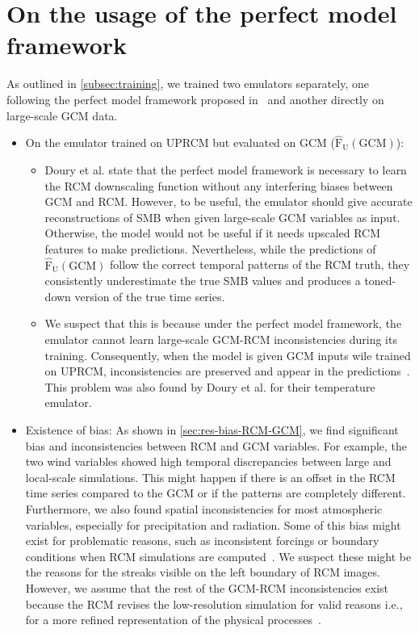\documentclass[a4paper,11pt,oneside]{report}
\begin{document}
\section{On the usage of the perfect model framework}\label{sec:disc-perfect-model}
As outlined in \autoref{subsec:training}, we trained two emulators separately, one following the perfect model framework proposed in~\cite{Doury} and another directly on large-scale GCM data. 
\begin{itemize}
    \item On the emulator trained on UPRCM but evaluated on GCM ($\mathrm{\hat{F}_{U}(GCM)}$): 
    \begin{itemize}
        \item Doury et al. state that the perfect model framework is necessary to learn the RCM downscaling function without any interfering biases between GCM and RCM. However, to be useful, the emulator should give accurate reconstructions of SMB when given large-scale GCM variables as input. Otherwise, the model would not be useful if it needs upscaled RCM features to make predictions. Nevertheless, while the predictions of $\mathrm{\hat{F}_{U}(GCM)}$ follow the correct temporal patterns of the RCM truth, they consistently underestimate the true SMB values and produces a toned-down version of the true time series.
        \item We suspect that this is because under the perfect model framework, the emulator cannot learn large-scale GCM-RCM inconsistencies during its training. Consequently, when the model is given GCM inputs wile trained on UPRCM, inconsistencies are preserved and appear in the predictions~\cite{Doury}. This problem was also found by Doury et al. for their temperature emulator. 
    \end{itemize}
    \item Existence of bias: As shown in \autoref{sec:res-bias-RCM-GCM}, we find significant bias and inconsistencies between RCM and GCM variables. For example, the two wind variables showed high temporal discrepancies between large and local-scale simulations. This might happen if there is an offset in the RCM time series compared to the GCM or if the patterns are completely different. Furthermore, we also found spatial inconsistencies for most atmospheric variables, especially for precipitation and radiation. Some of this bias might exist for problematic reasons, such as inconsistent forcings or boundary conditions when RCM simulations are computed~\cite{Doury, Laprise2008ChallengingST}. We suspect these might be the reasons for the streaks visible on the left boundary of RCM images. However, we assume that the rest of the GCM-RCM inconsistencies exist because the RCM revises the low-resolution simulation for valid reasons i.e., for a more refined representation of the physical processes~\cite{Doury}. 

\end{itemize}
\end{document}
